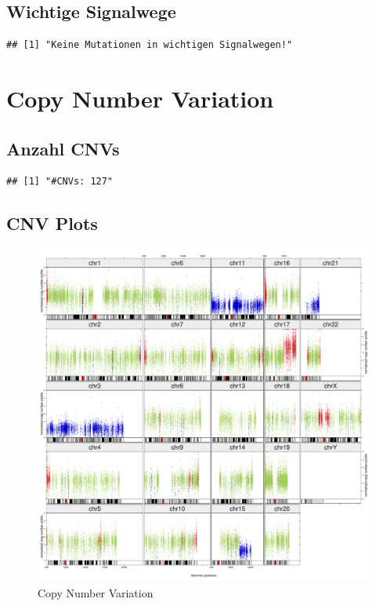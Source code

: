 \documentclass[woside,a4paper,12pt]{article}\usepackage[]{graphicx}\usepackage[]{color}
\makeatletter
\newenvironment{kframe}{%
 \def\at@end@of@kframe{}%
 \ifinner\ifhmode%
  \def\at@end@of@kframe{\end{minipage}}%
  \begin{minipage}{\columnwidth}%
 \fi\fi%
 \def\FrameCommand##1{\hskip\@totalleftmargin \hskip-\fboxsep
 \colorbox{shadecolor}{##1}\hskip-\fboxsep
     \hskip-\linewidth \hskip-\@totalleftmargin \hskip\columnwidth}%
 \MakeFramed {\advance\hsize-\width
   \@totalleftmargin\z@ \linewidth\hsize
   \@setminipage}}%
 {\par\unskip\endMakeFramed%
 \at@end@of@kframe}
\newenvironment{knitrout}{}{} %
\makeatother
\begin{document}
\begin{landscape}
\begin{knitrout}
\end{knitrout}
\clearpage
\subsection{Wichtige Signalwege}
\thispagestyle{empty}
\begin{knitrout}
\color{fgcolor}\begin{kframe}
\begin{verbatim}
## [1] "Keine Mutationen in wichtigen Signalwegen!"
\end{verbatim}
\end{kframe}
\end{knitrout}
\clearpage
\end{landscape}

\section{Copy Number Variation}
\subsection{Anzahl CNVs}
\begin{knitrout}
\color{fgcolor}\begin{kframe}
\begin{verbatim}
## [1] "#CNVs: 127"
\end{verbatim}
\end{kframe}
\end{knitrout}
\subsection{CNV Plots}
\begin{figure}[H]
\centering
\includegraphics[width=\textwidth]{somaticGermline_TCRBOA6_VCRome_CNV_Plot_2019-02-08.pdf}
\caption{Copy Number Variation}
\label{fig:11}
\end{figure}
\end{document}
